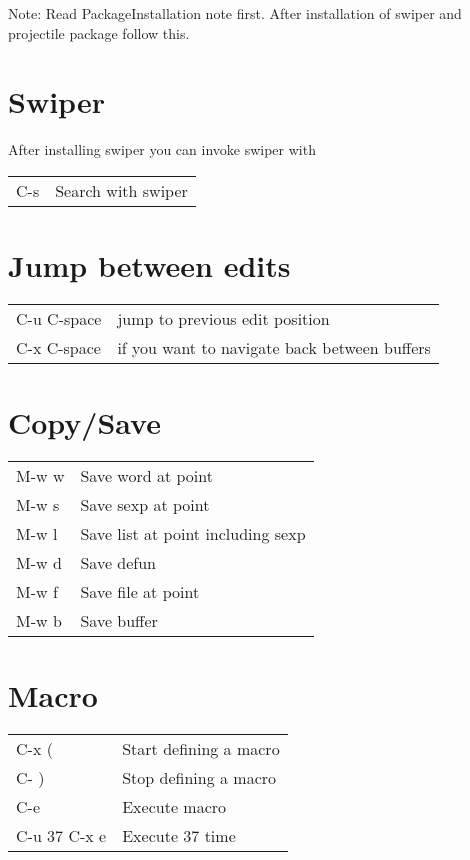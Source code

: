 \documentclass[11pt]{article}
\author{Pramod Nepal}
\date{\today}
\title{}
\begin{document}
\tableofcontents

Note: Read PackageInstallation note first. After installation of swiper and projectile package follow this.\\


\section{Swiper}
\label{sec:org7ab63bb}
After installing swiper you can invoke swiper with\\
\begin{center}
\begin{tabular}{ll}
C-s & Search with swiper\\
\end{tabular}
\end{center}

\section{Jump between edits}
\label{sec:orgf2f57b5}
\begin{center}
\begin{tabular}{ll}
\hline
C-u C-space & jump to previous edit position\\
C-x C-space & if you want to navigate back between buffers\\
\end{tabular}
\end{center}

\section{Copy/Save}
\label{sec:orge771673}
\begin{center}
\begin{tabular}{ll}
\hline
M-w w & Save word at point\\
M-w s & Save sexp at point\\
M-w l & Save list at point including sexp\\
M-w d & Save defun\\
M-w f & Save file at point\\
M-w b & Save buffer\\
\end{tabular}
\end{center}

\section{Macro}
\label{sec:orgedd41cd}
\begin{center}
\begin{tabular}{ll}
\hline
C-x ( & Start defining a macro\\
C- ) & Stop defining a macro\\
C-e & Execute macro\\
C-u 37 C-x e & Execute 37 time\\
\end{tabular}
\end{center}
\end{document}
